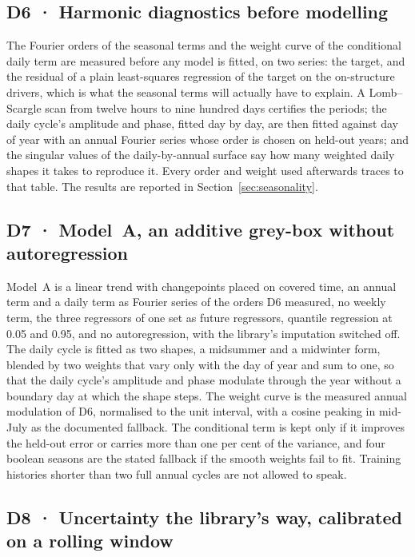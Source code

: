 \documentclass[11pt,a4paper]{article}
\begin{document}
\subsection{D6 · Harmonic diagnostics before modelling}

The Fourier orders of the seasonal terms and the weight curve of the
conditional daily term are measured before any model is fitted, on two series:
the target, and the residual of a plain least-squares regression of the target
on the on-structure drivers, which is what the seasonal terms will actually
have to explain. A Lomb--Scargle scan from twelve hours to nine hundred days
certifies the periods; the daily cycle's amplitude and phase, fitted day by
day, are then fitted against day of year with an annual Fourier series whose
order is chosen on held-out years; and the singular values of the
daily-by-annual surface say how many weighted daily shapes it takes to
reproduce it. Every order and weight used afterwards traces to that table. The
results are reported in Section~\ref{sec:seasonality}.

\subsection{D7 · Model~A, an additive grey-box without autoregression}

Model~A is a linear trend with changepoints placed on covered time, an annual
term and a daily term as Fourier series of the orders D6 measured, no weekly
term, the three regressors of one set as future regressors, quantile regression
at 0.05 and 0.95, and no autoregression, with the library's imputation switched
off. The daily cycle is fitted as two shapes, a midsummer and a midwinter form,
blended by two weights that vary only with the day of year and sum to one, so
that the daily cycle's amplitude and phase modulate through the year without a
boundary day at which the shape steps. The weight curve is the measured annual
modulation of D6, normalised to the unit interval, with a cosine peaking in
mid-July as the documented fallback. The conditional term is kept only if it
improves the held-out error or carries more than one per cent of the variance,
and four boolean seasons are the stated fallback if the smooth weights fail to
fit. Training histories shorter than two full annual cycles are not allowed to
speak.

\subsection{D8 · Uncertainty the library's way, calibrated on a rolling window}
\end{document}
